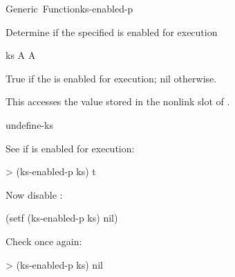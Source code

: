 \documentclass[10pt,twoside,english,pdftex]{article}
\begin{document}
\begin{functiondoc}{Generic~Function}{ks-enabled-p}{ 
    \returns{} }
%

\fnsyntax

\fnpurpose Determine if the specified  is enabled for
execution

\fnsetf
{}

\fnmethods
{}

\fnpackage {}

\fnmodule {}

\fnargs
\begin{args}{ks}
\arg[ks] A 
\arg[boolean] A 
\end{args}

\fnreturns True if the  is enabled for execution; nil otherwise.
  
\fndescription 
This  accesses the value stored in the 
 nonlink slot of .

\begin{alsos}{undefine-ks}
\also[define-ks]
\also[ks]
\also[undefine-ks]
\end{alsos}

\fnexamples
See if   is enabled for execution:
\begin{example}
> (ks-enabled-p ks)
t
\end{example}

Now disable  :
\begin{example}
  (setf (ks-enabled-p ks) nil)
\end{example}

Check once again:
\begin{example}
> (ks-enabled-p ks)
nil
\end{example}

\end{functiondoc}

\end{document}
